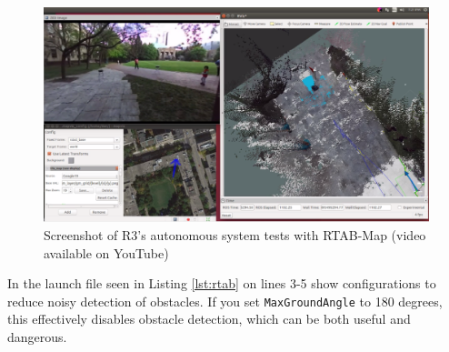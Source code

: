 \documentclass[runningheads,a4paper]{llncs}
\begin{document}
\begin{figure}
\centering
\includegraphics[width=\textwidth]{autosoftware}
\caption{Screenshot of R3's autonomous system tests with RTAB-Map (video available on YouTube\protect\footnotemark)}
\label{fig:autosoftware}
\end{figure}


In the launch file seen in Listing \ref{lst:rtab} on lines 3-5 show configurations to reduce noisy detection of obstacles. If you set \texttt{MaxGroundAngle} to 180 degrees, this effectively disables obstacle detection, which can be both useful and dangerous.
\end{document}
